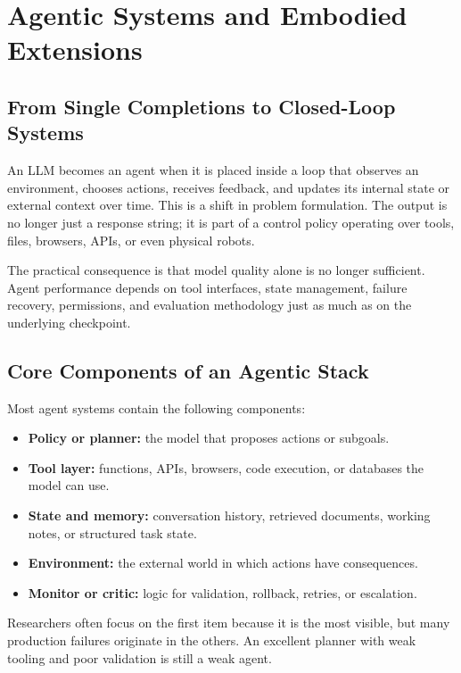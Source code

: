 \documentclass[class=article,crop=false]{standalone}
\begin{document}
\section{Agentic Systems and Embodied Extensions}
\label{sec:agents}

\subsection{From Single Completions to Closed-Loop Systems}
\label{sec:agents:motivation}

An LLM becomes an agent when it is placed inside a loop that observes an environment, chooses actions, receives feedback, and updates its internal state or external context over time. This is a shift in problem formulation. The output is no longer just a response string; it is part of a control policy operating over tools, files, browsers, APIs, or even physical robots.

The practical consequence is that model quality alone is no longer sufficient. Agent performance depends on tool interfaces, state management, failure recovery, permissions, and evaluation methodology just as much as on the underlying checkpoint.

\subsection{Core Components of an Agentic Stack}
\label{sec:agents:components}

Most agent systems contain the following components:
\begin{itemize}
  \item \textbf{Policy or planner:} the model that proposes actions or subgoals.
  \item \textbf{Tool layer:} functions, APIs, browsers, code execution, or databases the model can use.
  \item \textbf{State and memory:} conversation history, retrieved documents, working notes, or structured task state.
  \item \textbf{Environment:} the external world in which actions have consequences.
  \item \textbf{Monitor or critic:} logic for validation, rollback, retries, or escalation.
\end{itemize}

Researchers often focus on the first item because it is the most visible, but many production failures originate in the others. An excellent planner with weak tooling and poor validation is still a weak agent.
\end{document}
